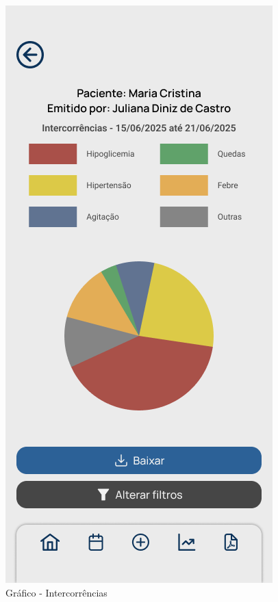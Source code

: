 \begin{figure}
	\centering
	\includegraphics[width=0.6\linewidth]{MyMed - Modelagem/Gráfico - Intercorrências.png}
	\caption{Gráfico - Intercorrências}
	\label{grafico_intercorrencias}
\end{figure}

